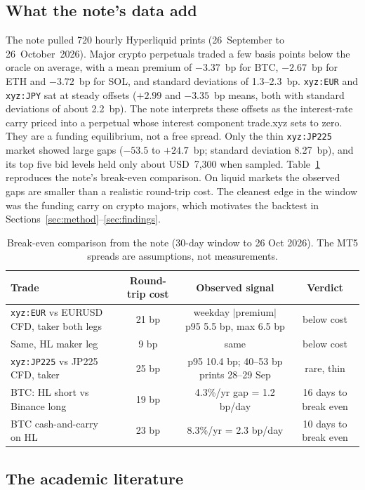 \documentclass[11pt,a4paper]{article}
\begin{document}
\subsection{What the note's data add}
The note pulled 720 hourly Hyperliquid prints (26~September to 26~October~2026).
Major crypto perpetuals traded a few basis points below the oracle on average, with a mean premium of $-3.37$~bp for BTC, $-2.67$~bp for ETH and $-3.72$~bp for SOL, and standard deviations of 1.3--2.3~bp.
\texttt{xyz:EUR} and \texttt{xyz:JPY} sat at steady offsets ($+2.99$ and $-3.35$~bp means, both with standard deviations of about 2.2~bp).
The note interprets these offsets as the interest-rate carry priced into a perpetual whose interest component trade.xyz sets to zero. They are a funding equilibrium, not a free spread.
Only the thin \texttt{xyz:JP225} market showed large gaps ($-53.5$ to $+24.7$~bp; standard deviation 8.27~bp), and its top five bid levels held only about USD~7{,}300 when sampled.
Table~\ref{tab:breakeven} reproduces the note's break-even comparison. On liquid markets the observed gaps are smaller than a realistic round-trip cost. The cleanest edge in the window was the funding carry on crypto majors, which motivates the backtest in Sections~\ref{sec:method}--\ref{sec:findings}.

\begin{table}[H]
\centering\small
\caption{Break-even comparison from the note (30-day window to 26 Oct 2026). The MT5 spreads are assumptions, not measurements.}
\label{tab:breakeven}
\begin{tabularx}{\textwidth}{Xccc}
\toprule
Trade & Round-trip cost & Observed signal & Verdict\\
\midrule
\texttt{xyz:EUR} vs EURUSD CFD, taker both legs & 21 bp & weekday $|$premium$|$ p95 5.5 bp, max 6.5 bp & below cost\\
Same, HL maker leg & 9 bp & same & below cost\\
\texttt{xyz:JP225} vs JP225 CFD, taker & 25 bp & p95 10.4 bp; 40--53 bp prints 28--29 Sep & rare, thin\\
BTC: HL short vs Binance long & 19 bp & 4.3\%/yr gap = 1.2 bp/day & 16 days to break even\\
BTC cash-and-carry on HL & 23 bp & 8.3\%/yr = 2.3 bp/day & 10 days to break even\\
\bottomrule
\end{tabularx}
\end{table}

\subsection{The academic literature}
\end{document}
